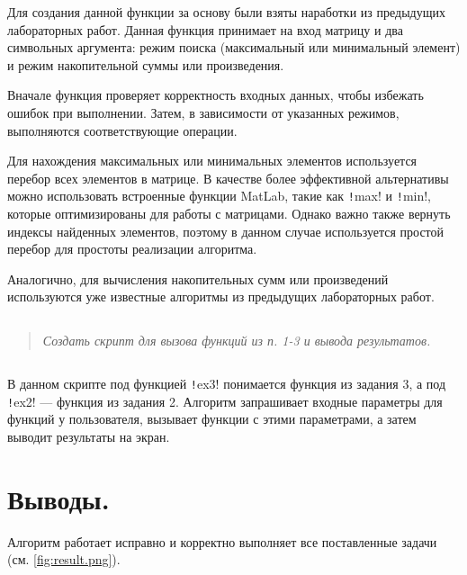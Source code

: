 Для создания данной функции за основу были взяты наработки из предыдущих лабораторных работ.
Данная функция принимает на вход матрицу и два символьных аргумента: режим поиска (максимальный или минимальный элемент) и режим накопительной суммы или произведения.

Вначале функция проверяет корректность входных данных, чтобы избежать ошибок при выполнении. Затем, в зависимости от указанных режимов, выполняются соответствующие операции.

Для нахождения максимальных или минимальных элементов используется перебор всех элементов в матрице. В качестве более эффективной альтернативы можно использовать встроенные функции MatLab, такие как \texttt!max! и \texttt!min!, которые оптимизированы для работы с матрицами. Однако важно также вернуть индексы найденных элементов, поэтому в данном случае используется простой перебор для простоты реализации алгоритма.

Аналогично, для вычисления накопительных сумм или произведений используются уже известные алгоритмы из предыдущих лабораторных работ.

\subsection*{  }
\begin{quote}
    \textit{Создать скрипт для вызова функций из п. 1-3 и вывода результатов.}
\end{quote}

\begin{codemultipage}
    \inputminted{matlab}{code/ex4.m}
\end{codemultipage}

В данном скрипте под функцией \texttt!ex3! понимается функция из задания 3, а под \texttt!ex2! --- функция из задания 2.
Алгоритм запрашивает входные параметры для функций у пользователя, вызывает функции с этими параметрами, а затем выводит результаты на экран.

\section*{Выводы.}

Алгоритм работает исправно и корректно выполняет все поставленные задачи (см. \cref{fig:result.png}).

